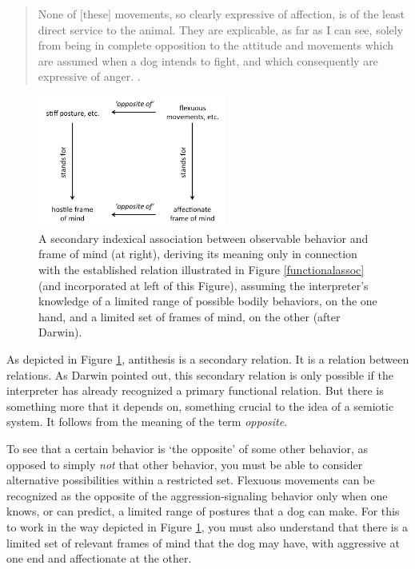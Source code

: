 \begin{quotation}
None of $[$these$]$ movements, so clearly expressive of 
affection, is of the least direct service to the animal. They are 
explicable, as far as I can see, solely from being in complete 
opposition to the attitude and movements which are assumed when a dog 
intends to fight, and which consequently are expressive of anger. 
\citep[15-16]{darwin_expression_1872}. 
\end{quotation}


\begin{figure}[h]
\includegraphics[width=0.55\textwidth,keepaspectratio]{figures/Fig04}
\caption{A secondary indexical association between observable behavior 
and frame of mind (at right), deriving its meaning only in connection 
with the established relation illustrated in Figure \ref{functionalassoc} (and incorporated 
at left of this Figure), assuming the interpreter's knowledge of a 
limited range of possible bodily behaviors, on the one hand, and a 
limited set of frames of mind, on the other (after Darwin).}
\label{secondaryassoc}
\end{figure}

As depicted in Figure \ref{secondaryassoc}, antithesis is a secondary relation. It is a relation between relations. As Darwin 
pointed out, this secondary relation is only possible if the interpreter has already recognized a primary functional relation. But there is something 
more that it depends on, something crucial to the idea of a semiotic 
system. It follows from the meaning of the term \textit{opposite}. 



To see that a certain behavior is `the opposite' of some 
other behavior, as opposed to simply \textit{not} that other behavior, 
you must be able to consider alternative possibilities within a 
restricted set. Flexuous movements can be recognized as the opposite of 
the aggression-signaling behavior only when one knows, or can predict, a 
limited range of postures that a dog can make. For this to work in 
the way depicted in Figure \ref{secondaryassoc}, you must also understand that there is a 
limited set of relevant frames of mind that the dog may have, with aggressive at one end and affectionate at the other. 



